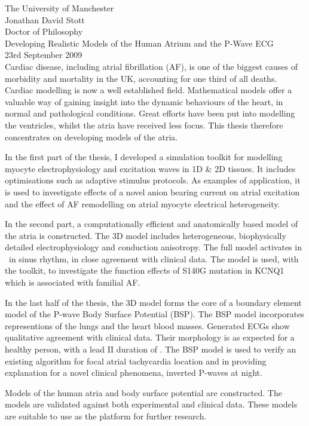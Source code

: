 The University of Manchester\\
Jonathan David Stott\\
Doctor of Philosophy\\
Developing Realistic Models of the Human Atrium and the P-Wave ECG\\
23rd September 2009\\

Cardiac disease, including atrial fibrillation (AF), is one of the biggest causes of
morbidity and mortality in the UK, accounting for one third of all
deaths.\cite{foo}
Cardiac modelling is now a well established field.
Mathematical models offer a valuable way of gaining insight into the dynamic
behaviours of the heart, in normal and pathological conditions.
Great efforts have been put into modelling the ventricles, whilst the atria have
received less focus.
This thesis therefore concentrates on developing models of the atria.

In the first part of the thesis, I developed a simulation toolkit for
modelling myocyte electrophysiology and excitation waves in 1D \& 2D
tissues.
It includes optimisations such as adaptive stimulus protocols.
As examples of application, it is used to investigate effects of a novel anion
bearing current on atrial excitation and the effect of AF remodelling on atrial
myocyte electrical heterogeneity.

In the second part, a computationally efficient and anatomically based model of
the atria is constructed.
The 3D model includes heterogeneous, biophysically detailed
electrophysiology and conduction anisotropy.
The full model activates in \ in sinus rhythm, in
close agreement with clinical data.
The model is used, with the toolkit, to investigate the function effects of S140G
mutation in KCNQ1 which is associated with familial AF.

In the last half of the thesis, the 3D model forms the core of a boundary
element model of the P-wave Body Surface Potential (BSP).
The BSP model incorporates representions of the lungs and the heart blood masses.
Generated ECGs show qualitative agreement with clinical data.
Their morphology is as expected for a healthy person, with a lead II duration of
.
The BSP model is used to verify an existing algorithm for focal atrial
tachycardia location and in providing explanation for a novel clinical
phenomena, inverted P-waves at night.


Models of the human atria and body surface potential are constructed.
The models are validated against both experimental and clinical data.
These models are suitable to use as the platform for further research.


